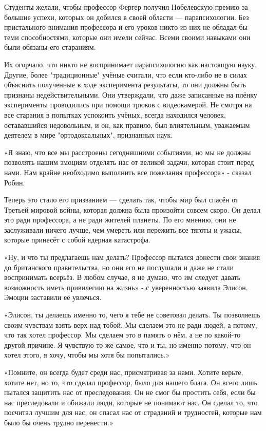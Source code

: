 \documentclass[a4paper,12pt]{book}
\begin{document}
\par
Студенты желали, чтобы профессор Фергер получил Нобелевскую премию за большие успехи, которых он добился в своей области — парапсихологии. Без пристального внимания профессора и его уроков никто из них не обладал бы теми способностями, которые они имели сейчас. Всеми своими навыками они были обязаны его стараниям.
\par
Их огорчало, что никто не воспринимает парапсихологию как настоящую науку. Другие, более "традиционные" учёные считали, что если кто-либо не в силах объяснить полученные в ходе эксперимента результаты, то они должны быть признаны недействительными. Они утверждали, что даже записанные на плёнку эксперименты проводились при помощи трюков с видеокамерой. Не смотря на все старания в попытках успокоить учёных, всегда находился человек, остававшийся недовольным, и он, как правило, был влиятельным, уважаемым деятелем в мире "ортодоксальных", признанных наук.\\
\par
«Я знаю, что все мы расстроены сегодняшними событиями, но мы не должны позволять нашим эмоциям отделять нас от великой задачи, которая стоит перед нами. Нам крайне необходимо выполнить все пожелания профессора» - сказал Робин.
\par
Теперь это стало его призванием — сделать так, чтобы мир был спасён от Третьей мировой войны, которая должна была произойти совсем скоро. Он делал это ради профессора, а не ради жителей планеты. По его мнению, они не заслуживали ничего лучше, чем умереть или пережить все тяготы и ужасы, которые принесёт с собой ядерная катастрофа.\\
\par
«Ну, и что ты предлагаешь нам делать? Профессор пытался донести свои знания до британского правительства, но они его не послушали и даже не стали воспринимать всерьёз. В любом случае, я не думаю, что им следует давать возможность иметь привилегию на жизнь» - с уверенностью заявила Элисон. Эмоции заставили её увлечься.
\par
«Элисон, ты делаешь именно то, чего я тебе не советовал делать. Ты позволяешь своим чувствам взять верх над тобой. Мы сделаем это не ради людей, а потому, что так хотел профессор. Мы сделаем это в память о нём, а не по какой-то другой причине. Я чувствую то же самое, что и ты, но именно потому, что он хотел этого, я хочу, чтобы мы хотя бы попытались.»
\par
«Помните, он всегда будет среди нас, присматривая за нами. Хотите верьте, хотите нет, но то, что сделал профессор, было для нашего блага. Он всего лишь пытался защитить нас от преследования. Он не смог бы простить себя, если бы нас преследовали и обижали люди, которые не понимают нас. Он сделал то, что посчитал лучшим для нас, он спасал нас от страданий и трудностей, которые нам было бы очень трудно перенести.»
\end{document}
